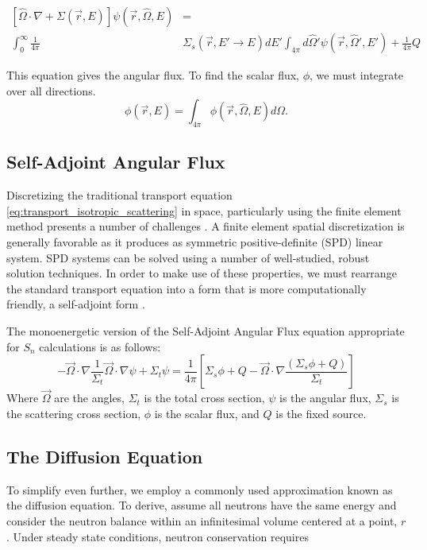 \begin{equation}
\begin{split}
 [\hat{\Omega} \cdot \nabla + \Sigma(\vec{r}, E)]\psi(\vec{r}, \hat{\Omega}, E) &= \\  \int_0^\infty \frac{1}{4\pi} &\Sigma_s(\vec{r}, E' \rightarrow E)  dE' \int_{4\pi} d\hat{\Omega}'\psi(\vec{r}, \hat{\Omega}', E')  + \frac{1}{4\pi}Q 
\end{split}
 \label{eq:transport_isotropic_scattering}
\end{equation}


This equation gives the angular flux. To find the scalar flux, $\phi$, we must integrate over all directions.
\begin{equation}
    \phi(\vec{r}, E) = \int_{4\pi} \phi(\vec{r}, \hat{\Omega}, E) d \Omega.
\end{equation}

\subsection{Self-Adjoint Angular Flux}
Discretizing the traditional transport equation \eqref{eq:transport_isotropic_scattering} in space, particularly using the finite element method presents a number of challenges \cite{saaf}. A finite element spatial discretization is generally favorable as it produces as symmetric positive-definite (SPD) linear system. SPD systems can be solved using a number of well-studied, robust solution techniques. In order to make use of these properties, we must rearrange the standard transport equation into a form that is more computationally friendly, a self-adjoint form \cite{saaf}.



The monoenergetic version of the Self-Adjoint Angular Flux equation appropriate for $S_n$ calculations is as follows:
\begin{equation}
    - \vec{\Omega} \cdot \nabla \frac{1}{\Sigma_t}\vec{\Omega} \cdot \nabla \psi + \Sigma_t \psi = \frac{1}{4\pi}[\Sigma_s\phi + Q - \vec{\Omega} \cdot \nabla \frac{(\Sigma_s\phi + Q)}{\Sigma_t}]
    \label{eq:SAAF}
\end{equation}
Where $\vec{\Omega}$ are the angles, $\Sigma_t$ is the total cross section, $\psi$ is the angular flux, $\Sigma_s$ is the scattering cross section, $\phi$ is the scalar flux, and $Q$ is the fixed source.


\subsection{The Diffusion Equation}
To simplify even further, we employ a commonly used approximation known as the diffusion equation. To derive, assume all neutrons have the same energy and consider the neutron balance within an infinitesimal volume centered at a point, $r$. Under steady state conditions, neutron conservation requires

